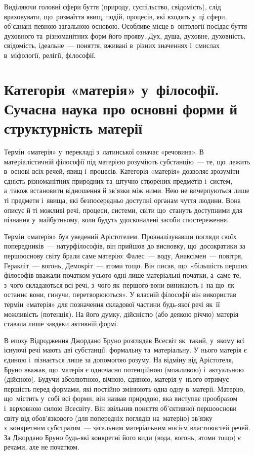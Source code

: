 \documentclass[a5paper,oneside,DIV=12,12pt,headings=small]{scrartcl}
\begin{document}
		Виділяючи головні сфери буття (природу, суспільство, свідомість), слід враховувати, що~розмаїття явищ, подій, процесів, які входять у~ці сфери, об'єднані певною загальною основою. Особливе місце в~онтології посідає буття духовного та~різноманітних форм його прояву. Дух, душа, духовне, духовність, свідомість, ідеальне~— поняття, вживані в~різних значеннях і~смислах в~міфології, релігії, філософії.
		
	\section{Категорія «матерія» у~філософії. Сучасна наука про основні форми й структурність матерії}
		Термін «матерія» у~перекладі з~латинської означає «речовина». В матеріалістичній філософії під матерією розуміють субстанцію~— те, що~лежить в~основі всіх речей, явищ і~процесів. Категорія «матерія» дозволяє зрозуміти єдність різноманітних природних та~штучно створених предметів і~систем, а~також встановити відношення й зв'яз\-ки між ними. Нею не вичерпуються лише ті предмети і~явища,  які безпосередньо доступні органам чуття людини. Вона описує й ті можливі речі, процеси, системи, світи що~стануть доступними для пізнання у~майбутньому, коли будуть удосконалені засоби спостереження.
	
		Термін «матерія» був уведений Арістотелем. Проаналізувавши погляди своїх попередників~— натурфілософів, він прийшов до висновку, що~досократики за першооснову світу брали саме матерію: Фалес~— воду, Анаксімен~— повітря, Геракліт~— вогонь, Демокріт~— атоми тощо. Він писав, що~«більшість перших філософів вважали початком усього одні лише матеріальні початки, а~саме те, з~чого складаються всі речі, з~чого як~першого вони виникають і~на що~як останнє вони, гинучи, перетворюються». У власній філософії він використав термін «матерія» для позначення складової частини будь-якої речі як~її можливість (потенція). На його думку, дійсністю (або деякою річчю) матерія ставала лише завдяки активній формі.
		
		В епоху Відродження Джордано Бруно розглядав Всесвіт як~такий, у~якому всі існуючі речі мають дві субстанції: формальну та~матеріальну. У нього матерія є єдиною і~пізнається лише за допомогою розуму. На відміну від Арістотеля, Бруно вважав, що~матерія є одночасно потенційною (можливою) і~актуальною (дійсною). Будучи абсолютною, вічною, єдиною, матерія у~нього отримує першість перед формами, які постійно змінюють одна одну в~матерії. Матерію, що~містить у~собі всі форми, він назвав природою, яка виступає прообразом і~верховною силою Всесвіту. Він звільнив поняття об'\-єк\-тив\-ної першооснови світу від обов'\-яз\-ко\-во\-го (для попередніх поглядів на~матерію) зв'яз\-ку з~конкретним субстратом~— загальним матеріальним носієм властивостей речей. За Джордано Бруно будь-які конкретні його види (вода, вогонь, атоми тощо) є речами, але не початком.
		
\end{document}
